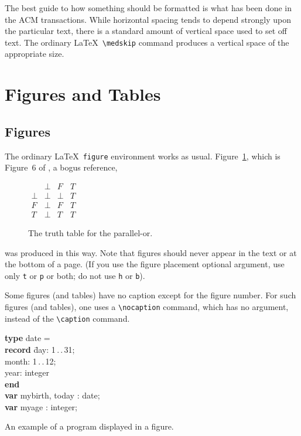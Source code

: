 \documentclass[acmtocl]{acmtrans2m}
\begin{document}
The best guide to how something should be formatted is what has been
done in the ACM transactions.  While horizontal spacing tends to 
depend
strongly upon the particular text, there is a standard amount of
vertical space used to set off text.  The ordinary \LaTeX\ 
\verb|\medskip| command produces a vertical space of the appropriate
size.

\section{Figures and Tables}

\subsection{Figures}

The ordinary \LaTeX\ {\tt figure} environment works as usual.
Figure~\ref{fig:ordinary}, which is Figure~6 of , a 
bogus reference,
\begin{figure}
\centering
\(\begin{array}{c|ccc}
     & \bot & F & T \\
\hline
\bot & \bot & \bot & T \\
F    & \bot & F    & T \\
T    & \bot & T    & T
\end{array}\)
\caption{The truth table for the parallel-or.}
\label{fig:ordinary}
\end{figure}
was produced in this way.
Note that figures should never appear in the text or at the bottom of
a page. (If you use the figure placement optional argument, use only
\verb"t" or \verb"p" or both; do not use \verb"h" or \verb"b").

Some figures (and tables) have no caption except for the figure 
number.
For such figures (and tables), one uses a \verb|\nocaption| command,
which has no argument, instead of the \verb|\caption| command.

\begin{narrowfig}{3in}
\begin{tabbing}
{\bf type} date =\\
\hspace*{1em}\= {\bf record} \= day: 1\,.\,.\,31;\+\+\\
                                month: 1\,.\,.\,12;\\
                                year: integer \-\\
                {\bf end} \-\\
{\bf var} mybirth, today : date;\\
{\bf var} myage : integer;
\end{tabbing}
\caption{An example of a program displayed in a figure.}
\label{fig:narrow}
\end{narrowfig}
\end{document}
